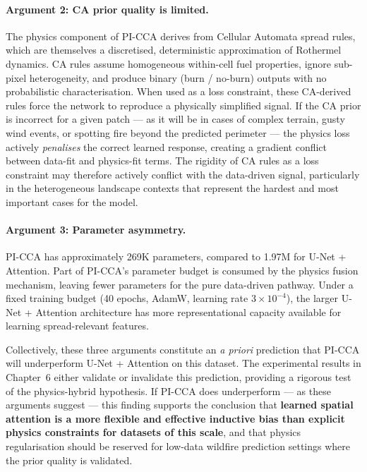 \paragraph{Argument 2: CA prior quality is limited.}
The physics component of PI-CCA derives from Cellular Automata spread rules, which are themselves a discretised, deterministic approximation of Rothermel dynamics.
CA rules assume homogeneous within-cell fuel properties, ignore sub-pixel heterogeneity, and produce binary (burn / no-burn) outputs with no probabilistic characterisation.
When used as a loss constraint, these CA-derived rules force the network to reproduce a physically simplified signal.
If the CA prior is incorrect for a given patch — as it will be in cases of complex terrain, gusty wind events, or spotting fire beyond the predicted perimeter — the physics loss actively \emph{penalises} the correct learned response, creating a gradient conflict between data-fit and physics-fit terms.
The rigidity of CA rules as a loss constraint may therefore actively conflict with the data-driven signal, particularly in the heterogeneous landscape contexts that represent the hardest and most important cases for the model.

\paragraph{Argument 3: Parameter asymmetry.}
PI-CCA has approximately 269K parameters, compared to 1.97M for U-Net + Attention.
Part of PI-CCA's parameter budget is consumed by the physics fusion mechanism, leaving fewer parameters for the pure data-driven pathway.
Under a fixed training budget (40 epochs, AdamW, learning rate $3 \times 10^{-4}$), the larger U-Net + Attention architecture has more representational capacity available for learning spread-relevant features.

Collectively, these three arguments constitute an \emph{a priori} prediction that PI-CCA will underperform U-Net + Attention on this dataset.
The experimental results in Chapter~6 either validate or invalidate this prediction, providing a rigorous test of the physics-hybrid hypothesis.
If PI-CCA does underperform — as these arguments suggest — this finding supports the conclusion that \textbf{learned spatial attention is a more flexible and effective inductive bias than explicit physics constraints for datasets of this scale}, and that physics regularisation should be reserved for low-data wildfire prediction settings where the prior quality is validated.

